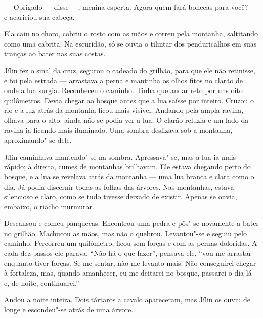 --- Obrigado --- disse ---, menina esperta. Agora quem fará bonecas para
você? --- e acariciou sua cabeça.

Ela caiu no choro, cobriu o rosto com as mãos e correu pela montanha,
saltitando como uma cabrita. Na escuridão, só se ouvia o tilintar dos
penduricalhos em suas tranças ao bater nas suas costas.

Jílin fez o sinal da cruz, segurou o cadeado do grilhão, para que ele
não retinisse, e foi pela estrada --- arrastava a perna e mantinha os
olhos fitos no clarão de onde a lua surgia. Reconheceu o caminho. Tinha
que andar reto por uns oito quilômetros. Devia chegar ao bosque antes
que a lua saísse por inteiro. Cruzou o rio e a luz atrás da montanha
ficou mais visível. Andando pela ampla ravina, olhava para o alto: ainda
não se podia ver a lua. O clarão reluzia e um lado da ravina ia ficando
mais iluminado. Uma sombra deslizava sob a montanha, aproximando"-se
dele.

Jílin caminhava mantendo"-se na sombra. Apressava"-se, mas a lua ia mais
rápido; à direita, cumes de montanhas brilhavam. Ele estava chegando
perto do bosque, e a lua se revelava atrás da montanha --- uma lua
branca e clara como o dia. Já podia discernir todas as folhas das
árvores. Nas montanhas, estava silencioso e claro, como se tudo tivesse
deixado de existir. Apenas se ouvia, embaixo, o riacho murmurar.


Descansou e comeu panquecas. Encontrou uma pedra e pôs"-se novamente a
bater no grilhão. Machucou as mãos, mas não o quebrou. Levantou"-se e
seguiu pelo caminho. Percorreu um quilômetro, ficou sem forças e com as
pernas doloridas. A cada dez passos ele parava. ``Não há o que fazer'',
pensava ele, ``vou me arrastar enquanto tiver forças. Se me sentar, não
me levanto mais. Não conseguirei chegar à fortaleza, mas, quando
amanhecer, eu me deitarei no bosque, passarei o dia lá e, de noite,
continuarei.''

Andou a noite inteira. Dois tártaros a cavalo apareceram, mas Jílin os
ouviu de longe e escondeu"-se atrás de uma árvore.


